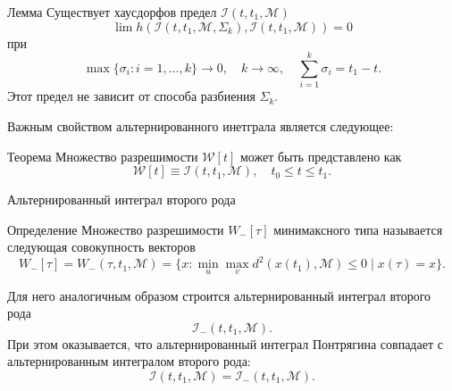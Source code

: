 \documentclass{beamer}
\begin{document}
\begin{frame}
    \begin{block}{Лемма}
    Существует хаусдорфов предел \( \mathcal{I}(t, t_1, \mathcal{M}) \)
    \[
        \lim h \left( \mathcal{I}(t, t_1, \mathcal{M}, \Sigma_k), \mathcal{I}(t, t_1, \mathcal{M})
         \right) = 0
    \]
    при 
    \[
        \max\{\sigma_i: i = 1,\dots, k \} \to 0, \quad k \to \infty, \quad \sum_{i = 1}^k \sigma_i 
         = t_1 - t. 
    \]
    Этот предел не зависит от способа разбиения \( \Sigma_k \).
    \end{block}
    Важным свойством альтернированного инетграла является следующее:
\begin{block}{Теорема}
    Множество разрешимости \( \mathcal{W}[t] \) может быть представлено как 
    \begin{equation*}
        \mathcal{W}[t] \equiv \mathcal{I}(t, t_1, \mathcal{M}), \quad
         t_0 \le t \le t_1.
    \end{equation*}
\end{block}
\end{frame}

\begin{frame}{Альтернированный интеграл второго рода}
    \begin{block}{Определение}
    Множество разрешимости \( W_-[\tau] \) минимаксного типа называется следующая совокупность
     векторов
    \[
        W_-[\tau] = W_-(\tau, t_1, \mathcal{M}) = \{ x : \min_u \max_v d^2(x(t_1),
         \mathcal{M}) \le 0 \mid x(\tau) = x \}.
    \]
    \end{block}
    Для него аналогичным образом строится альтернированный интеграл второго рода
    \begin{equation*}
        \mathcal{I}_-(t, t_1, \mathcal{M}).
    \end{equation*}
    При этом оказывается, что альтернированный интеграл Понтрягина совпадает с альтернированным интегралом второго рода:
    \begin{equation*}
        \mathcal{I}(t, t_1, \mathcal{M}) = \mathcal{I}_-(t, t_1, \mathcal{M}).
    \end{equation*}
\end{frame}
\end{document}

